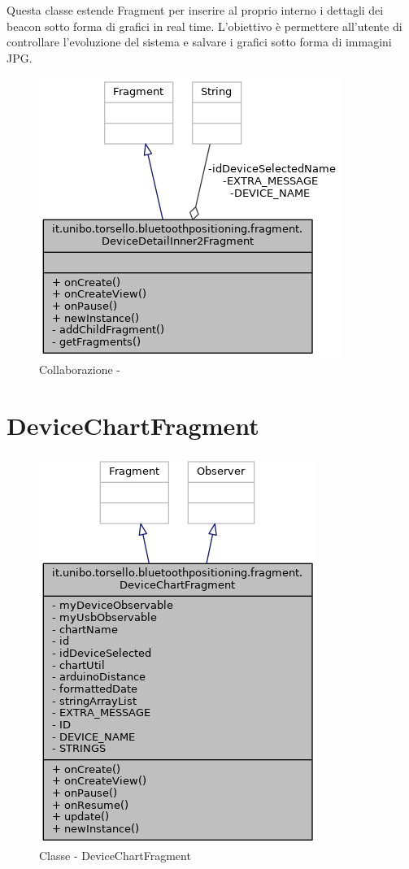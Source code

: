 Questa classe estende Fragment per inserire al proprio interno i dettagli dei beacon sotto forma di grafici in real time. L'obiettivo è permettere all'utente di controllare l'evoluzione del sistema e salvare i grafici sotto forma di immagini JPG.

\begin{figure}[ph]
	\centering
	\includegraphics[width=0.55\linewidth]{img/uml/class/classit_1_1unibo_1_1torsello_1_1bluetoothpositioning_1_1fragment_1_1DeviceDetailInner2Fragment__coll__graph.png}
	\caption{Collaborazione - }
\end{figure}

\newpage
\section{DeviceChartFragment}
\begin{figure}[ph]
	\centering
	\includegraphics[width=0.5\linewidth]{img/uml/class/classit_1_1unibo_1_1torsello_1_1bluetoothpositioning_1_1fragment_1_1DeviceChartFragment__inherit__graph.png}
	\caption{Classe - DeviceChartFragment}
\end{figure}

